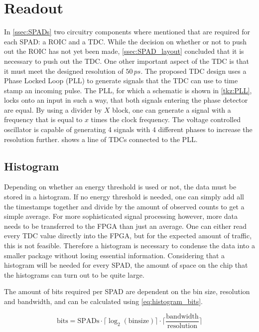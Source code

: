 \section{Readout}\label{ssec:readout}
In \cref{ssec:SPADs} two circuitry components where mentioned that are required for each SPAD: a ROIC and a TDC. While the decision on whether or not to push out the ROIC has not yet been made, \cref{ssec:SPAD_layout} concluded that it is necessary to push out the TDC. One other important aspect of the TDC is that it must meet the designed resolution of $50\,ps$. The proposed TDC design uses a Phase Locked Loop (PLL) to generate signals that the TDC can use to time stamp an incoming pulse. The PLL, for which a schematic is shown in \cref{tkz:PLL}, locks onto an input in such a way, that both signals entering the phase detector are equal. By using a divider by $X$ block, one can generate a signal with a frequency that is equal to $x$ times the clock frequency. The voltage controlled oscillator is capable of generating 4 signals with 4 different phases to increase the resolution further.  shows a line of TDCs connected to the PLL.
		




\subsection{Histogram}
Depending on whether an energy threshold is used or not, the data must be stored in a histogram. If no energy threshold is needed, one can simply add all the timestamps together and divide by the amount of observed counts to get a simple  average. For more sophisticated signal processing however, more data needs to be transferred to the FPGA than just an average. One can either read every TDC value directly into the FPGA, but for the expected amount of traffic, this  is not feasible. Therefore a histogram is necessary to condense the data into a smaller package without losing essential information. Considering that a histogram will be needed for every SPAD, the amount of space on the chip that the histograms can turn out to be quite large. 

The amount of bits required per SPAD are dependent on the bin size, resolution and bandwidth, and can be calculated using \cref{eq:histogram_bits}. 

\begin{equation}
		\text{bits} = \text{SPADs}\cdot\lceil \log_2(\text{binsize}) \rceil\cdot \lceil \frac{\text{bandwidth}}{\text{resolution}}\rceil
		\label{eq:histogram_bits}
\end{equation}

